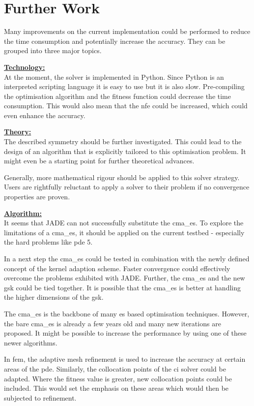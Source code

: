\documentclass[./\jobname.tex]{subfiles}
\begin{document}
\chapter{Further Work}

Many improvements on the current implementation could be performed to reduce the time consumption and potentially increase the accuracy. They can be grouped into three major topics.  

\underline{\textbf{Technology:}} \\
At the moment, the solver is implemented in Python. Since Python is an interpreted scripting language it is easy to use but it is also slow. Pre-compiling the optimisation algorithm and the fitness function could decrease the time consumption. This would also mean that the \gls{nfe} could be increased, which could even enhance the accuracy.

\underline{\textbf{Theory:}}\\
The described symmetry should be further investigated. This could lead to the design of an algorithm that is explicitly tailored to this optimisation problem. It might even be a starting point for further theoretical advances.

Generally, more mathematical rigour should be applied to this solver strategy. Users are rightfully reluctant to apply a solver to their problem if no convergence properties are proven. 

\underline{\textbf{Algorithm:}}\\
It seems that JADE can not successfully substitute the \gls{cma_es}. To explore the limitations of a \gls{cma_es}, it should be applied on the current testbed - especially the hard problems like \gls{pde} 5. 

In a next step the \gls{cma_es} could be tested in combination with the newly defined concept of the kernel adaption scheme. Faster convergence could effectively overcome the problems exhibited with JADE. Further, the \gls{cma_es} and the new \gls{gsk} could be tied together. It is possible that the \gls{cma_es} is better at handling the higher dimensions of the \gls{gsk}. 

The \gls{cma_es} is the backbone of many \gls{es} based optimisation techniques. However, the bare \gls{cma_es} is already a few years old and many new iterations are proposed. It might be possible to increase the performance by using one of these newer algorithms. 

In \gls{fem}, the adaptive mesh refinement is used to increase the accuracy at certain areas of the \gls{pde}. Similarly, the collocation points of the \gls{ci} solver could be adapted. Where the fitness value is greater, new collocation points could be included. This would set the emphasis on these areas which would then be subjected to refinement. 
\end{document}
